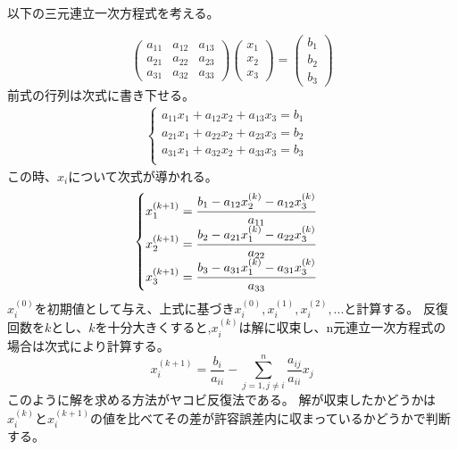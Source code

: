 \documentclass{ujarticle}
\begin{document}
以下の三元連立一次方程式を考える。

\begin{equation}
	\left(
		\begin{array}{ccc}
			a_{11} & a_{12} & a_{13} \\
			a_{21} & a_{22} & a_{23} \\
			a_{31} & a_{32} & a_{33}
		\end{array}
	\right)
	\left(
		\begin{array}{c}
			x_{1} \\ x_{2} \\ x_{3}
		\end{array}
	\right)
	=
	\left(
		\begin{array}{c}
			b_{1} \\ b_{2} \\ b_{3}
		\end{array}
	\right)
\end{equation}
前式の行列は次式に書き下せる。
\begin{eqnarray}
  \begin{cases}
    a_{11} x_{1} + a_{12} x_{2} + a_{13} x_{3} = b_{1} & \\
    a_{21} x_{1} + a_{22} x_{2} + a_{23} x_{3} = b_{2} & \\
    a_{31} x_{1} + a_{32} x_{2} + a_{33} x_{3} = b_{3} & \\
  \end{cases}
\end{eqnarray}
この時、$x_{i}$について次式が導かれる。
\begin{eqnarray}
	\begin{cases}
		x_{1}^{(k+1)} = \cfrac{b_{1} - a_{12}x_{2}^{(k)} - a_{12}x_{3}^{(k)}}{a_{11}} & \\
		x_{2}^{(k+1)} = \cfrac{b_{2} - a_{21}x_{1}^{(k)} - a_{22}x_{3}^{(k)}}{a_{22}} & \\
		x_{3}^{(k+1)} = \cfrac{b_{3} - a_{31}x_{1}^{(k)} - a_{31}x_{3}^{(k)}}{a_{33}}
	\end{cases}
\end{eqnarray}
$x_{i}^{(0)}$を初期値として与え、上式に基づき$x_{i}^{(0)},x_{i}^{(1)},x_{i}^{(2)},...$と計算する。
反復回数を$k$とし、$k$を十分大きくすると,$x_{i}^{(k)}$は解に収束し、n元連立一次方程式の場合は次式により計算する。
\begin{equation}
x_{i}^{(k+1)} = \frac{b_{i}}{a_{ii}} - \sum_{j=1,j \ne i}^{n} \frac{a_{ij}}{a_{ii}}x_{j}
\end{equation}
このように解を求める方法がヤコビ反復法である。
解が収束したかどうかは$x_{i}^{(k)}$と$x_{i}^{(k+1)}$の値を比べてその差が許容誤差内に収まっているかどうかで判断する。
\end{document}
